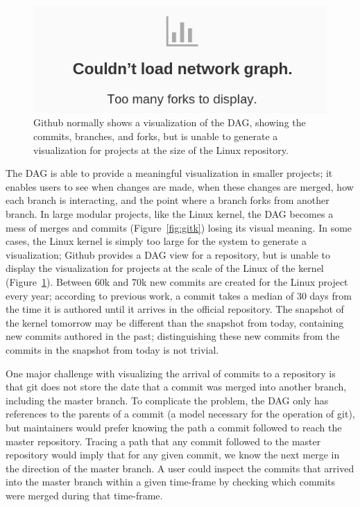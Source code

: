\begin{figure}
        \centering
        \includegraphics[width=0.8\figwidth]{figures/github_viewer.png}
        \caption{Github normally shows a visualization of the DAG,
          showing the commits, branches, and forks, but is unable to
          generate a visualization for projects at the size of the Linux
          repository.}
        \label{fig:gitfail}
\end{figure}

The DAG is able to provide a meaningful visualization in smaller
projects; it enables users to see when changes are made, when these
changes are merged, how each branch is interacting, and the point where
a branch forks from another branch. In large modular projects, like
the Linux kernel, the DAG becomes a mess of merges and commits
(Figure~\ref{fig:gitk}) losing its visual meaning. In some cases, the
Linux kernel is simply too large for the system to generate a
visualization; Github provides a DAG view for a repository, but is
unable to display the visualization for projects at the scale of the
Linux of the kernel (Figure~\ref{fig:gitfail}). Between 60k and 70k new
commits are created for the Linux project every year; according to
previous work\cite{German2015}, a commit takes a median of 30 days from
the time it is authored until it arrives in the official repository. The
snapshot of the kernel tomorrow may be different than the snapshot from
today, containing new commits authored in the past; distinguishing these
new commits from the commits in the snapshot from today is not trivial.

One major challenge with visualizing the arrival of commits to a
repository is that git does not store the date that a commit was merged
into another branch, including the master branch. To complicate the
problem, the DAG only has references to the parents of a commit (a
model necessary for the operation of git), but maintainers would prefer
knowing the path a commit followed to reach the master repository.
Tracing a path that any commit followed to the master repository would
imply that for any given commit, we know the next merge in the direction
of the master branch. A user could inspect the commits that arrived into
the master branch within a given time-frame by checking which commits
were merged during that time-frame.

